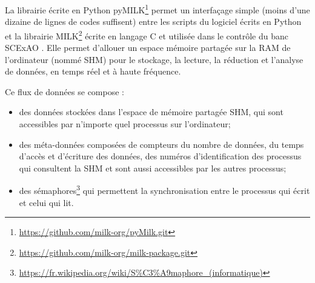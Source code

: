 

La librairie écrite en Python \ac{pyMILK}\footnote{\url{https://github.com/milk-org/pyMilk.git}} permet un interfaçage simple (moins d'une dizaine de lignes de codes suffisent) entre les scripts du logiciel écrits en Python et la librairie \ac{MILK}\footnote{\url{https://github.com/milk-org/milk-package.git}} écrite en langage C et utilisée dans le contrôle du banc \ac{SCExAO} \citep{guyon2020}. Elle permet d'allouer un espace mémoire partagée sur la \ac{RAM} de l'ordinateur (nommé \ac{SHM}) pour le stockage, la lecture, la réduction et l'analyse de données, en temps réel et à haute fréquence.

Ce flux de données se compose :
\begin{itemize}
    \item des données stockées dans l'espace de mémoire partagée \ac{SHM}, qui sont accessibles par n'importe quel processus sur l'ordinateur;
    \item des méta-données composées de compteurs du nombre de données, du temps d'accès et d'écriture des données, des numéros d'identification des processus qui consultent la \ac{SHM} et sont aussi accessibles par les autres processus;
    \item des sémaphores\footnote{\url{https://fr.wikipedia.org/wiki/S\%C3\%A9maphore_(informatique)}} qui permettent la synchronisation entre le processus qui écrit et celui qui lit.
\end{itemize}

